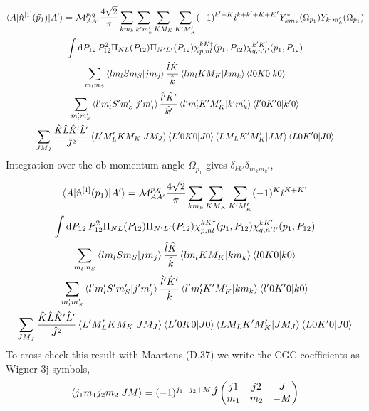 \documentclass[10pt]{article}
\def\threej#1{\inthreej(#1)}
\def\inthreej(#1,#2,#3,#4,#5,#6){\begin{pmatrix}#1 & #2 & #3 \\ #4 & #5 & #6 \end{pmatrix}}
\begin{document}
\begin{multline*}
\braket{ A | \hat{n}^{[1]}(\vec{p}_1) | A'} = \mathcal{M}_{A A'}^{p,q} \frac{4 \sqrt{2}}{\pi} \sum_{k m_k} \sum_{k' m_k'} \sum_{K M_K} \sum_{K' M_K'} (-1)^{k'+K} i^{k+k'+K+K'} Y_{k m_k}^{*}(\Omega_{p_1}) Y_{k' m_k'}(\Omega_{p_1}) \\
 \int \text{d} P_{12} \, P_{12}^{2} \Pi_{N L}(P_{12}) \Pi_{N' L'}(P_{12}) \chi_{p,nl}^{kK\dagger}(p_1,P_{12}) \chi_{q,n'l'}^{k'K'}(p_1,P_{12}) \\
 \sum_{m_l m_S} \braket{l m_l S m_S | j m_j} \frac{ \hat{l} \hat{K}}{\hat{k}} \braket{ l m_l K M_K | k m_k } \braket{ l 0 K 0 | k 0}  \\
  \sum_{m_l' m_S'} \braket{l' m_l' S' m_S' | j' m_j'} \frac{ \hat{l}' \hat{K}'}{ \hat{k'}} \braket{ l' m_l' K' M_K' | k' m_k' } \braket{ l' 0 K' 0 | k' 0}  \\
   \sum_{J M_J} \frac{ \hat{K} \hat{L} \hat{K}' \hat{L}'}{ \hat{J}^{2}} \braket{ L' M_L' K M_K | J M_J} \braket{ L' 0 K 0 | J 0 }  \braket{ L M_L K' M_K' | J M} \braket{ L 0 K' 0 | J 0} \\
\end{multline*}
Integration over the ob-momentum angle $\Omega_{p_1}$ gives $ \delta_{k k'} \delta_{m_k m_k'}$,
\begin{multline*}
\braket{ A | \hat{n}^{[1]}(p_1) | A'} = \mathcal{M}_{A A'}^{p,q} \frac{4 \sqrt{2}}{\pi} \sum_{k m_k} \sum_{K M_K} \sum_{K' M_K'} (-1)^{K} i^{K+K'}  \\
 \int \text{d} P_{12} \, P_{12}^{2} \Pi_{N L}(P_{12}) \Pi_{N' L'}(P_{12}) \chi_{p,nl}^{kK\dagger}(p_1,P_{12}) \chi_{q,n'l'}^{kK'}(p_1,P_{12}) \\
 \sum_{m_l m_S} \braket{l m_l S m_S | j m_j} \frac{ \hat{l} \hat{K}}{\hat{k}} \braket{ l m_l K M_K | k m_k } \braket{ l 0 K 0 | k 0}  \\
  \sum_{m_l' m_S'} \braket{l' m_l' S' m_S' | j' m_j'} \frac{ \hat{l}' \hat{K}'}{ \hat{k}} \braket{ l' m_l' K' M_K' | k m_k } \braket{ l' 0 K' 0 | k 0}  \\
   \sum_{J M_J} \frac{ \hat{K} \hat{L} \hat{K}' \hat{L}'}{ \hat{J}^{2}} \braket{ L' M_L' K M_K | J M_J} \braket{ L' 0 K 0 | J 0 }  \braket{ L M_L K' M_K' | J M_J} \braket{ L 0 K' 0 | J 0} \\
\end{multline*}
To cross check this result with Maartens (D.37) we write the CGC coefficients as Wigner-3j symbols,
\begin{align*}
	\braket{ j_1 m_1 j_2 m_2 | J M } = (-1)^{j_1 - j_2 + M} \hat{J} \threej{j1,j2,J,m_1,m_2,-M}
\end{align*}
\end{document}
